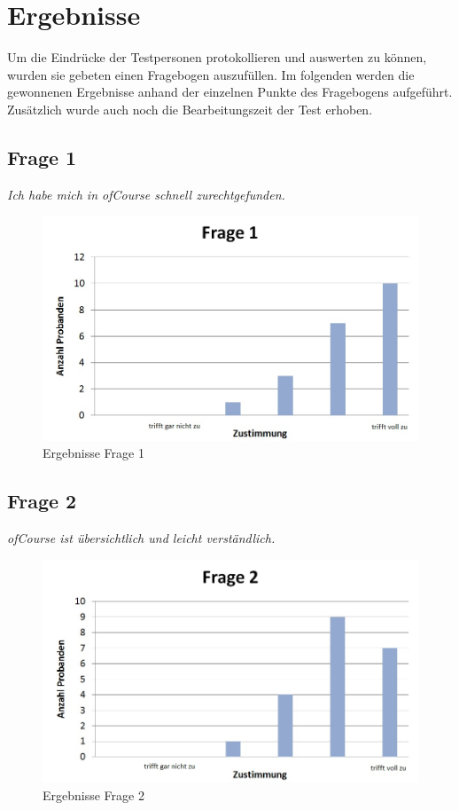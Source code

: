 \section{Ergebnisse}
Um die Eindrücke der Testpersonen protokollieren und auswerten zu können, wurden sie gebeten einen Fragebogen auszufüllen.
Im folgenden werden die gewonnenen Ergebnisse anhand der einzelnen Punkte des Fragebogens aufgeführt. Zusätzlich
wurde auch noch die Bearbeitungszeit der Test erhoben.

\subsection{Frage 1}
\begin{center}
	{\it Ich habe mich in ofCourse schnell zurechtgefunden.}
\end{center}
\begin{figure}[h]
\centering
\includegraphics[width=0.7\linewidth]{img/Frage1}
\caption{Ergebnisse Frage 1}
\label{fig:Frage1}
\end{figure}

\subsection{Frage 2}
\begin{center}
	{\it ofCourse ist übersichtlich und leicht verständlich.}
\end{center}
\begin{figure}[h]
\centering
\includegraphics[width=0.7\linewidth]{img/Frage2}
\caption{Ergebnisse Frage 2}
\label{fig:Frage2}
\end{figure}


